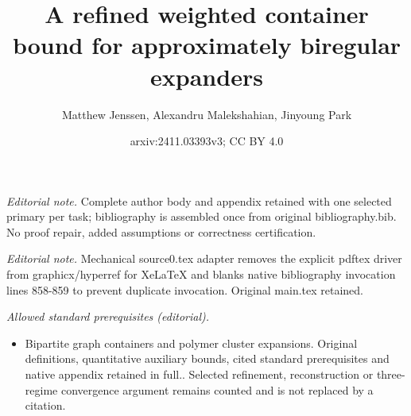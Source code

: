 \documentclass[10pt,a4paper]{amsart}
\title{A refined weighted container bound for approximately biregular expanders}
\author{Matthew Jenssen, Alexandru Malekshahian, Jinyoung Park}
\date{arxiv:2411.03393v3; CC BY 4.0}
\theoremstyle{definition}
\newcommand{\0}[0]{\emptyset}
\begin{document}
\maketitle
\noindent\textit{Editorial note.} Complete author body and appendix retained with one selected primary per task; bibliography is assembled once from original bibliography.bib. No proof repair, added assumptions or correctness certification.\par\medskip
\noindent\textit{Editorial note.} Mechanical source0.tex adapter removes the explicit pdftex driver from graphicx/hyperref for XeLaTeX and blanks native bibliography invocation lines 858-859 to prevent duplicate invocation. Original main.tex retained.\par\medskip
\noindent\textit{Allowed standard prerequisites (editorial).}\begin{itemize}
\item Bipartite graph containers and polymer cluster expansions. Original definitions, quantitative auxiliary bounds, cited standard prerequisites and native appendix retained in full.. Selected refinement, reconstruction or three-regime convergence argument remains counted and is not replaced by a citation.
\end{itemize}\medskip
\end{document}
